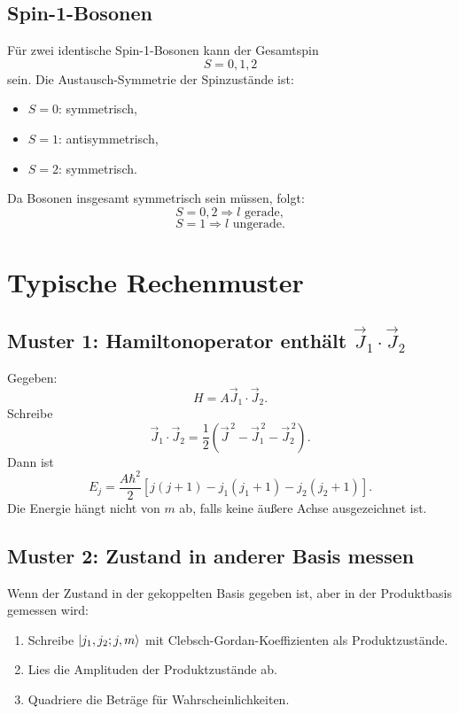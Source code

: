 \subsection{Spin-1-Bosonen}

Für zwei identische Spin-1-Bosonen kann der Gesamtspin
\[
    S=0,1,2
\]
sein. Die Austausch-Symmetrie der Spinzustände ist:
\begin{itemize}
    \item \(S=0\): symmetrisch,
    \item \(S=1\): antisymmetrisch,
    \item \(S=2\): symmetrisch.
\end{itemize}
Da Bosonen insgesamt symmetrisch sein müssen, folgt:
\[
    S=0,2 \Rightarrow l \text{ gerade},
\]
\[
    S=1 \Rightarrow l \text{ ungerade}.
\]

\section{Typische Rechenmuster}

\subsection{Muster 1: Hamiltonoperator enthält \texorpdfstring{\(\vec J_1\cdot\vec J_2\)}{J1 dot J2}}

\begin{calculationbox}
Gegeben:
\[
    H=A\vec J_1\cdot\vec J_2.
\]
Schreibe
\[
    \vec J_1\cdot\vec J_2
    =\frac12(\vec J^{\,2}-\vec J_1^{\,2}-\vec J_2^{\,2}).
\]
Dann ist
\[
    E_{j}=\frac{A\hbar^2}{2}\left[j(j+1)-j_1(j_1+1)-j_2(j_2+1)\right].
\]
Die Energie hängt nicht von \(m\) ab, falls keine äußere Achse ausgezeichnet ist.
\end{calculationbox}

\subsection{Muster 2: Zustand in anderer Basis messen}

Wenn der Zustand in der gekoppelten Basis gegeben ist, aber in der Produktbasis gemessen wird:
\begin{enumerate}
    \item Schreibe \(\left|j_1,j_2;j,m\right\rangle\) mit Clebsch-Gordan-Koeffizienten als Produktzustände.
    \item Lies die Amplituden der Produktzustände ab.
    \item Quadriere die Beträge für Wahrscheinlichkeiten.
\end{enumerate}

